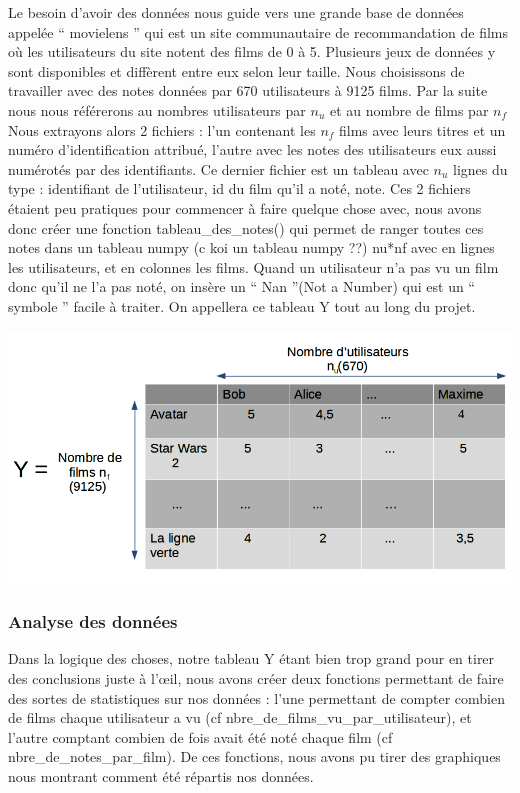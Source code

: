 \documentclass[a4paper,10pt]{article}
\begin{document}
Le besoin d'avoir des données nous guide vers une grande base de données appelée `` movielens '' qui est un site communautaire de recommandation de films où les utilisateurs du site notent des films de 0 à 5.
Plusieurs jeux de données y sont disponibles et diffèrent entre eux selon leur taille. 
Nous choisissons de travailler avec des notes données par 670 utilisateurs à 9125 films.
Par la suite nous nous référerons au nombres utilisateurs par $n_u$ et au nombre de films par $n_f$
Nous extrayons alors 2 fichiers : l’un contenant les $n_f$ films avec leurs titres et un numéro d'identification attribué,  
l’autre avec les notes des utilisateurs eux aussi numérotés par des identifiants.
Ce dernier fichier est un tableau avec $n_u$ lignes du type : identifiant de l’utilisateur, id du film qu’il a noté, note. 
Ces 2 fichiers étaient peu pratiques pour commencer à faire quelque chose avec,  
nous avons donc créer une fonction tableau\_des\_notes() qui permet de ranger toutes ces notes dans un tableau numpy (c koi un tableau numpy ??) nu*nf avec en lignes les utilisateurs,  
et en colonnes les films. Quand un utilisateur n’a pas vu un film donc qu’il ne l’a pas noté,  
on insère un `` Nan ''(Not a Number) qui est un `` symbole '' facile à traiter. On appellera ce tableau Y tout au long du projet. 

\includegraphics[scale=0.5]{matriceY.png}

\subsubsection{Analyse des données}
Dans la logique des choses, notre tableau Y étant bien trop grand pour en tirer des conclusions 
juste à l’œil, nous avons créer deux fonctions permettant de faire des sortes de statistiques sur nos données : l’une permettant de compter combien de films
chaque utilisateur a vu (cf nbre\_de\_films\_vu\_par\_utilisateur), et l’autre comptant combien de fois avait été noté chaque film 
(cf nbre\_de\_notes\_par\_film). De ces fonctions, nous avons pu tirer des graphiques nous montrant comment été répartis nos données.
\end{document}
